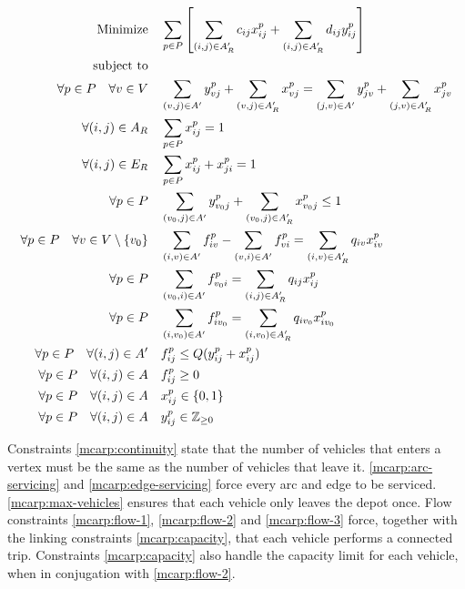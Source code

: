 \begin{align}
	\mbox{Minimize} & \quad
	\sum_{p \in P} \left[
		\sum_{(i,j) \in A_R^\prime} c_{ij} x^p_{ij} + 
		\sum_{(i,j) \in A_R^\prime} d_{ij} y^p_{ij}
	\right]
	\\
	\mbox{subject to} &  \notag{}
	\\
	\forall {p \in P} \quad \forall {v \in V} & \quad
		\sum_{(v,j) \in A^\prime} y^p_{vj} + \sum_{(v,j) \in A_R^\prime} x^p_{vj} =
		\sum_{(j,v) \in A^\prime} y^p_{jv} + \sum_{(j,v) \in A_R^\prime} x^p_{jv}
	\label{mcarp:continuity}
	\\
	\forall {(i,j) \in A_R} & \quad \sum_{p \in P} x^p_{ij} = 1
	\label{mcarp:arc-servicing}
	\\
	\forall {(i,j) \in E_R} & \quad \sum_{p \in P} x^p_{ij} + x^p_{ji} = 1
	\label{mcarp:edge-servicing}
	\\
	\forall {p \in P} & \quad
		\sum_{(v_0,j) \in A^\prime} y^p_{v_0j} +
		\sum_{(v_0,j) \in A_R^\prime} x^p_{v_0j}
	\leq 1
	\label{mcarp:max-vehicles}
	\\
	\forall {p \in P} \quad \forall {v \in V \setminus \{v_0\}} & \quad
		\sum_{(i,v) \in A^\prime} f^p_{iv} - \sum_{(v,i) \in A^\prime} f^p_{vi} =
		\sum_{(i,v) \in A_R^\prime} q_{iv} x^p_{iv}
	\label{mcarp:flow-1}
	\\
	\forall {p \in P} & \quad
	\sum_{(v_0,i) \in A^\prime} f^p_{v_0i} = \sum_{(i,j) \in A_R^\prime} q_{ij} x^p_{ij}
	\label{mcarp:flow-2}
	\\
	\forall {p \in P} & \quad
	\sum_{(i,v_0) \in A^\prime} f^p_{iv_0} = \sum_{(i,v_0) \in A_R^\prime} q_{iv_0} x^p_{iv_0}
	\label{mcarp:flow-3}
	\\
	\forall {p \in P} \quad \forall {(i,j) \in A^\prime} & \quad
	f^p_{ij} \leq Q(y^p_{ij} + x^p_{ij})
	\label{mcarp:capacity}
	\\
	\forall {p \in P} \quad \forall {(i,j) \in A} & \quad f^p_{ij} \geq 0 \\
	\forall {p \in P} \quad \forall {(i,j) \in A} & \quad x^p_{ij} \in \{0,1\} \\
	\forall {p \in P} \quad \forall {(i,j) \in A} & \quad y^p_{ij} \in \mathbb{Z}_{\geq0}
\end{align}

Constraints \eqref{mcarp:continuity} state that the number of vehicles that
enters a vertex must be the same as the number of vehicles that leave it.
\eqref{mcarp:arc-servicing} and \eqref{mcarp:edge-servicing} force every arc
and edge to be serviced. \eqref{mcarp:max-vehicles} ensures that each vehicle
only leaves the depot once. Flow constraints \eqref{mcarp:flow-1},
\eqref{mcarp:flow-2} and \eqref{mcarp:flow-3} force, together with the linking
constraints \eqref{mcarp:capacity}, that each vehicle performs a connected
trip. Constraints \eqref{mcarp:capacity} also handle the capacity limit for
each vehicle, when in conjugation with \eqref{mcarp:flow-2}.


